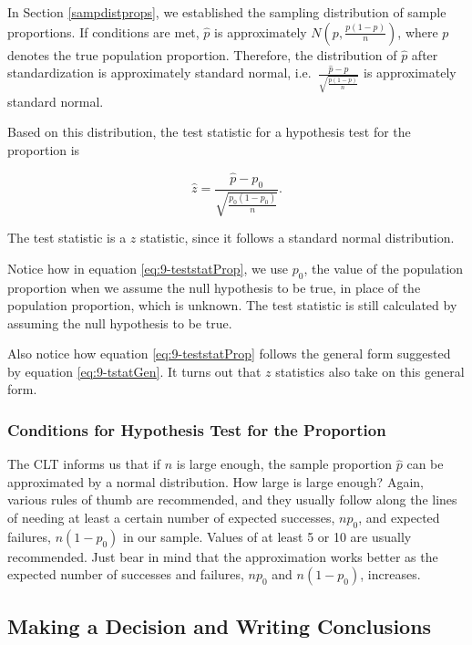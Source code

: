 \documentclass[
]{book}
\begin{document}
In Section \ref{sampdistprops}, we established the sampling distribution of sample proportions. If conditions are met, \(\hat{p}\) is approximately \(N\left(p, \frac{p(1-p)}{n}\right)\), where \(p\) denotes the true population proportion. Therefore, the distribution of \(\hat{p}\) after standardization is approximately standard normal, i.e.~\(\frac{\hat{p}-p}{\sqrt{\frac{p(1-p)}{n}}}\) is approximately standard normal.

Based on this distribution, the test statistic for a hypothesis test for the proportion is

\begin{equation} 
\hat{z} =  \frac{\hat{p} - p_0}{\sqrt{\frac{p_0(1-p_0)}{n}}} .
\label{eq:9-teststatProp}
\end{equation}

The test statistic is a \(z\) statistic, since it follows a standard normal distribution.

Notice how in equation \eqref{eq:9-teststatProp}, we use \(p_0\), the value of the population proportion when we assume the null hypothesis to be true, in place of the population proportion, which is unknown. The test statistic is still calculated by assuming the null hypothesis to be true.

Also notice how equation \eqref{eq:9-teststatProp} follows the general form suggested by equation \eqref{eq:9-tstatGen}. It turns out that \(z\) statistics also take on this general form.

\hypertarget{conditions-for-hypothesis-test-for-the-proportion}{%
\subsubsection{Conditions for Hypothesis Test for the Proportion}\label{conditions-for-hypothesis-test-for-the-proportion}}

The CLT informs us that if \(n\) is large enough, the sample proportion \(\hat{p}\) can be approximated by a normal distribution. How large is large enough? Again, various rules of thumb are recommended, and they usually follow along the lines of needing at least a certain number of expected successes, \(n p_0\), and expected failures, \(n(1-p_0)\) in our sample. Values of at least 5 or 10 are usually recommended. Just bear in mind that the approximation works better as the expected number of successes and failures, \(np_0\) and \(n(1-p_0)\), increases.

\hypertarget{making-a-decision-and-writing-conclusions}{%
\subsection{Making a Decision and Writing Conclusions}\label{making-a-decision-and-writing-conclusions}}
\end{document}
